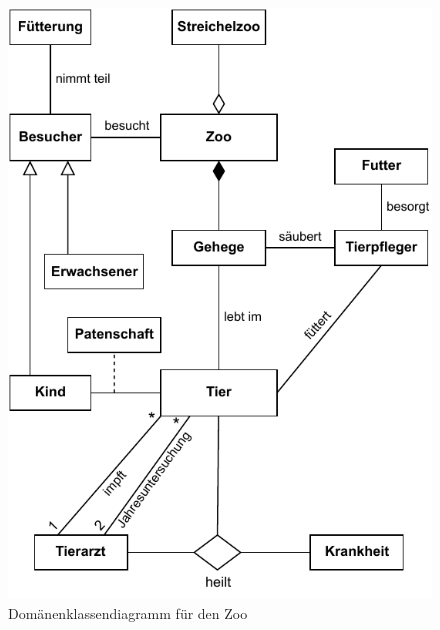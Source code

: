 \begin{figure}[h!]
	\centering
	\includegraphics{Bilder/Zoo/fallbeispiel_zoo.pdf}
	\caption{Domänenklassendiagramm für den Zoo}
	\label{fig:lektion2_fallbeispiel_zoo}
\end{figure}